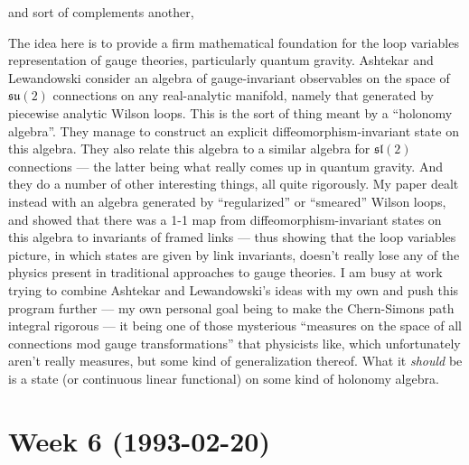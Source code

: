 \documentclass{article}
\def\tightlist{}
\renewcommand{\texttt}[1]{%
  \begingroup
  \ttfamily
  \begingroup\lccode`~=`/\lowercase{\endgroup\def~}{/\discretionary{}{}{}}%
  \begingroup\lccode`~=`[\lowercase{\endgroup\def~}{[\discretionary{}{}{}}%
  \begingroup\lccode`~=`.\lowercase{\endgroup\def~}{.\discretionary{}{}{}}%
  \catcode`/=\active\catcode`[=\active\catcode`.=\active
  \scantokens{#1\noexpand}%
  \endgroup
}
\begin{document}
and sort of complements another,


The idea here is to provide a firm mathematical foundation for the loop
variables representation of gauge theories, particularly quantum
gravity. Ashtekar and Lewandowski consider an algebra of gauge-invariant
observables on the space of \(\mathfrak{su}(2)\) connections on any
real-analytic manifold, namely that generated by piecewise analytic
Wilson loops. This is the sort of thing meant by a ``holonomy algebra''.
They manage to construct an explicit diffeomorphism-invariant state on
this algebra. They also relate this algebra to a similar algebra for
\(\mathfrak{sl}(2)\) connections --- the latter being what really comes
up in quantum gravity. And they do a number of other interesting things,
all quite rigorously. My paper dealt instead with an algebra generated
by ``regularized'' or ``smeared'' Wilson loops, and showed that there
was a 1-1 map from diffeomorphism-invariant states on this algebra to
invariants of framed links --- thus showing that the loop variables
picture, in which states are given by link invariants, doesn't really
lose any of the physics present in traditional approaches to gauge
theories. I am busy at work trying to combine Ashtekar and Lewandowski's
ideas with my own and push this program further --- my own personal goal
being to make the Chern-Simons path integral rigorous --- it being one
of those mysterious ``measures on the space of all connections mod gauge
transformations'' that physicists like, which unfortunately aren't
really measures, but some kind of generalization thereof. What it
\emph{should} be is a state (or continuous linear functional) on some
kind of holonomy algebra.
\hypertarget{week6}{%
\section{Week 6 (1993-02-20)}\label{week6}}

\end{document}
